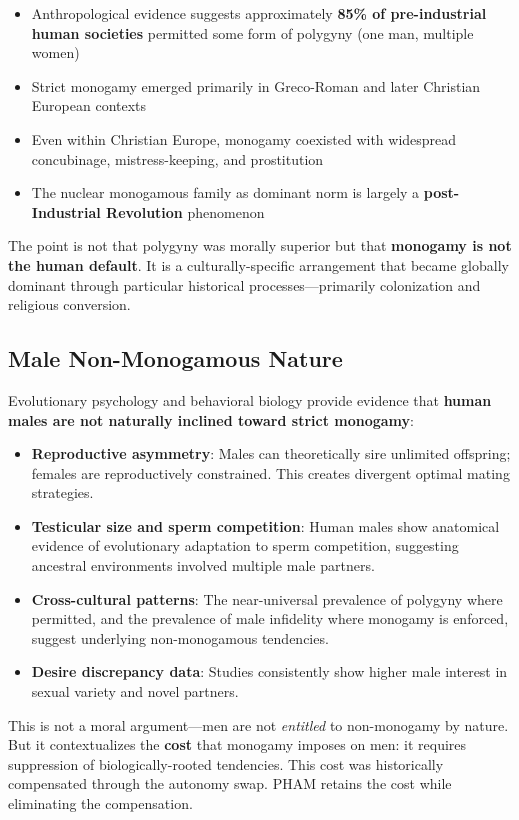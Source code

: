 \documentclass[12pt,openany]{book}
\numberwithin{equation}{chapter}
\begin{document}
\begin{itemize}
    \item Anthropological evidence suggests approximately \textbf{85\% of pre-industrial human societies} permitted some form of polygyny (one man, multiple women)
    \item Strict monogamy emerged primarily in Greco-Roman and later Christian European contexts
    \item Even within Christian Europe, monogamy coexisted with widespread concubinage, mistress-keeping, and prostitution
    \item The nuclear monogamous family as dominant norm is largely a \textbf{post-Industrial Revolution} phenomenon
\end{itemize}

The point is not that polygyny was morally superior but that \textbf{monogamy is not the human default}. It is a culturally-specific arrangement that became globally dominant through particular historical processes---primarily colonization and religious conversion.

\subsection{Male Non-Monogamous Nature}

Evolutionary psychology and behavioral biology provide evidence that \textbf{human males are not naturally inclined toward strict monogamy}:

\begin{itemize}
    \item \textbf{Reproductive asymmetry}: Males can theoretically sire unlimited offspring; females are reproductively constrained. This creates divergent optimal mating strategies.
    \item \textbf{Testicular size and sperm competition}: Human males show anatomical evidence of evolutionary adaptation to sperm competition, suggesting ancestral environments involved multiple male partners.
    \item \textbf{Cross-cultural patterns}: The near-universal prevalence of polygyny where permitted, and the prevalence of male infidelity where monogamy is enforced, suggest underlying non-monogamous tendencies.
    \item \textbf{Desire discrepancy data}: Studies consistently show higher male interest in sexual variety and novel partners.
\end{itemize}

This is not a moral argument---men are not \textit{entitled} to non-monogamy by nature. But it contextualizes the \textbf{cost} that monogamy imposes on men: it requires suppression of biologically-rooted tendencies. This cost was historically compensated through the autonomy swap. PHAM retains the cost while eliminating the compensation.
\end{document}
